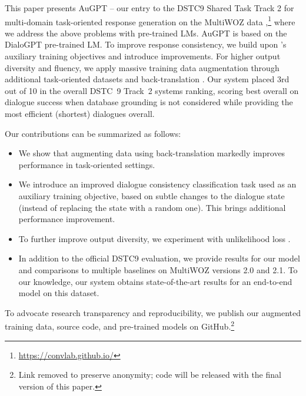 \documentclass[letterpaper]{article} %
\begin{document}
This paper presents AuGPT -- our entry to the DSTC9 Shared Task Track 2 \cite{gunasekara2020overview} for multi-domain task-oriented response generation on the MultiWOZ data \cite{budzianowski2018},\footnote{\url{https://convlab.github.io/}} where we address the above problems with pre-trained LMs. AuGPT is based on the DialoGPT pre-trained LM. To improve response consistency, we build upon \citet{peng2020}'s auxiliary training objectives and introduce improvements. For higher output diversity and fluency, we apply massive training data augmentation through additional task-oriented datasets and back-translation \cite{sennrich2016}. Our system placed 3rd out of 10 in the overall DSTC~9 Track~2 systems ranking, scoring best overall on dialogue success when database grounding is not considered while providing the most efficient (shortest) dialogues overall.

Our contributions can be summarized as follows:
\begin{itemize}
    \item We show that augmenting data using back-translation markedly improves performance in task-oriented settings.
    \item We introduce an improved dialogue consistency classification task used as an auxiliary training objective, based on subtle changes to the dialogue state (instead of replacing the state with a random one). This brings additional performance improvement.
    \item To further improve output diversity, we experiment with unlikelihood loss \cite{welleck2019,li_dont_2020}.
    \item In addition to the official DSTC9 evaluation, we provide results for our model and comparisons to multiple baselines on MultiWOZ versions 2.0 and 2.1. To our knowledge, our system obtains state-of-the-art results for an end-to-end model on this dataset.
\end{itemize}

To advocate research transparency and reproducibility, we publish our augmented training data, source code, and pre-trained models on GitHub.\footnote{Link removed to preserve anonymity; code will be released with the final version of this paper.}
\end{document}
